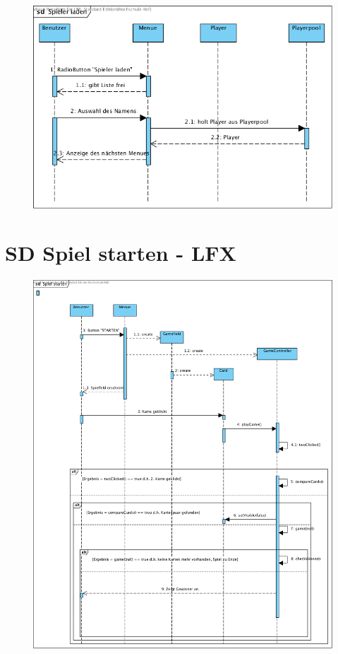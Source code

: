 \begin{figure}[!h]
	\centering
    \includegraphics[width=\textwidth]{./SD_Spieler_laden.png}
	\label{layout_gesamt}
\end{figure}


\clearpage
\section{SD Spiel starten - LFX}
\begin{figure}[!h]
	\centering
    \includegraphics[width=\textwidth]{./SD_Spiel_starten.png}
	\label{layout_gesamt}
\end{figure}





